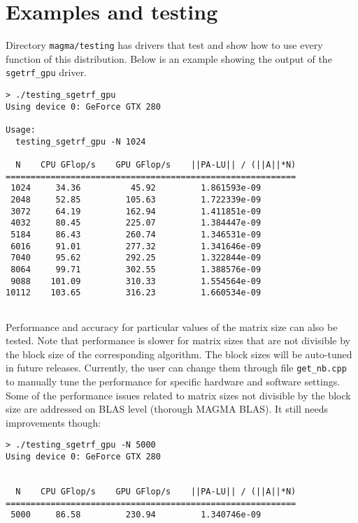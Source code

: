 \documentclass[10pt]{book}
\begin{document}
\newpage

\section{Examples and testing}\label{testing}
Directory {\tt magma/testing} has drivers that test and show how
to use every function of this distribution. Below is an example
showing the output of the {\tt sgetrf\_gpu} driver.

\begin{verbatim}
> ./testing_sgetrf_gpu
Using device 0: GeForce GTX 280

Usage: 
  testing_sgetrf_gpu -N 1024

  N    CPU GFlop/s    GPU GFlop/s    ||PA-LU|| / (||A||*N)
==========================================================
 1024     34.36          45.92         1.861593e-09
 2048     52.85         105.63         1.722339e-09
 3072     64.19         162.94         1.411851e-09
 4032     80.45         225.07         1.384447e-09
 5184     86.43         260.74         1.346531e-09
 6016     91.01         277.32         1.341646e-09
 7040     95.62         292.25         1.322844e-09
 8064     99.71         302.55         1.388576e-09
 9088    101.09         310.33         1.554564e-09
10112    103.65         316.23         1.660534e-09


\end{verbatim}

Performance and accuracy for particular values of the matrix
size can also be tested. Note that performance is slower
for matrix sizes that are not divisible by the block size of the 
corresponding algorithm. The block sizes will be auto-tuned
in future releases. Currently, the user can change them through
file {\tt get\_nb.cpp} to manually tune the performance for 
specific hardware and software settings. 
Some of the performance issues related to matrix sizes not 
divisible by the block size are addressed on BLAS level
(thorough MAGMA BLAS). It still needs improvements though:

\begin{verbatim}
> ./testing_sgetrf_gpu -N 5000
Using device 0: GeForce GTX 280


  N    CPU GFlop/s    GPU GFlop/s    ||PA-LU|| / (||A||*N)
==========================================================
 5000     86.58         230.94         1.340746e-09
\end{verbatim}
\end{document}

